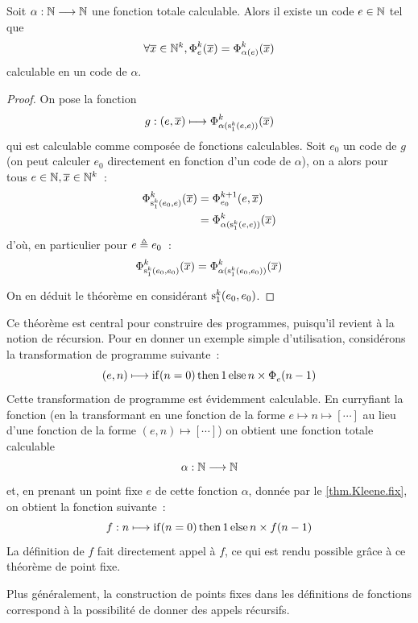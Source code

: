 \begin{theorem}\label{thm.Kleene.fix}
  Soit $\alpha : \displaystyle \mathbb N \longrightarrow \mathbb N$ une fonction totale calculable.
  Alors il existe un code $e \in \mathbb N$ tel que
  \[\forall \overline{x} \in \mathbb N^k, \operatorname{\Phi}_{e}^{k} (\overline{x})= \operatorname{\Phi}_{\alpha(e)}^{k}(\overline{x})\]
  calculable en un code de $\alpha$.
\end{theorem}

\begin{proof}
  On pose la fonction
  \[g : (e,\overline{x}) \longmapsto \operatorname{\Phi}_{\alpha(\mathrm{s}_{1}^{k}(e,e))}^{k}(\overline{x})\]
  qui est calculable comme composée de fonctions calculables.
  Soit $e_0$ un code de $g$ (on peut calculer $e_0$ directement en fonction
  d'un code de $\alpha$), on a alors pour tous $e \in \mathbb N,\overline{x} \in \mathbb N^k$~:
  \begin{align*}
    \operatorname{\Phi}_{\mathrm{s}_{1}^{k}(e_0,e)}^{k}(\overline{x})
    &= \operatorname{\Phi}_{e_0}^{k+1}(e,\overline{x}) \\
    &= \operatorname{\Phi}_{\alpha(\mathrm{s}_{1}^{k}(e,e))}^{k}(\overline{x})
  \end{align*}
  d'où, en particulier pour $e \triangleq e_0$~:
  \[\operatorname{\Phi}_{\mathrm{s}_{1}^{k}(e_0,e_0)}^{k}(\overline{x}) =
  \operatorname{\Phi}_{\alpha(\mathrm{s}_{1}^{k}(e_0,e_0))}^{k}(\overline{x})\]

  On en déduit le théorème en considérant $\mathrm{s}_{1}^{k}(e_0,e_0)$.
\end{proof}

Ce théorème est central pour construire des programmes, puisqu'il revient à
la notion de récursion. Pour en donner un exemple simple d'utilisation,
considérons la transformation de programme suivante~:
\[(e, n) \longmapsto \operatorname{if} (n = 0)\operatorname{then} 1 \operatorname{else}  n \times\operatorname{\Phi}_{e}^{}(n-1)\]
Cette transformation de programme est évidemment calculable. En curryfiant la
fonction (en la transformant en une fonction de la forme
$e \mapsto n \mapsto [\cdots]$ au lieu d'une fonction de la forme
$(e,n) \mapsto [\cdots]$) on obtient une fonction totale calculable
\[\alpha : \displaystyle \mathbb N \longrightarrow \mathbb N\]
et, en prenant un point fixe $e$ de cette fonction $\alpha$, donnée par le
\cref{thm.Kleene.fix}, on obtient la fonction suivante~:
\[f : n \longmapsto \operatorname{if} (n = 0) \operatorname{then} 1 \operatorname{else} n \times f(n-1)\]
La définition de $f$ fait directement appel à $f$, ce qui est rendu possible
grâce à ce théorème de point fixe.

Plus généralement, la construction de points fixes dans les définitions de
fonctions correspond à la possibilité de donner des appels récursifs.

